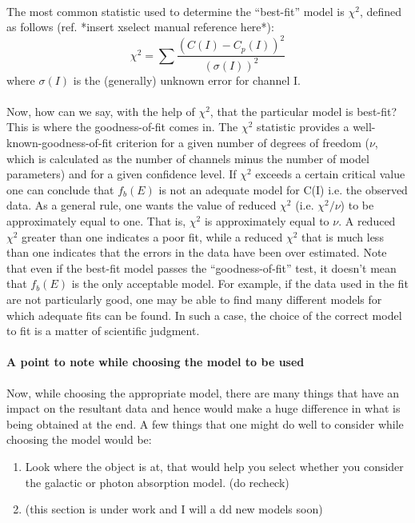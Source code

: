\documentclass[a4paper,twoside]{report}
\numberwithin{equation}{section}
\begin{document}
\paragraph{}
The most common statistic used to determine the “best-fit” model is $\chi^2$, defined as follows (ref. *insert xselect manual reference here*):
\begin{equation}
{\chi ^2} = \sum \frac{(C(I) - C_p (I))^2}{(\sigma (I))^2}
\end{equation}
where $\sigma (I)$ is the (generally) unknown error for channel I. 
\paragraph{}

Now, how can we say, with the help of $\chi ^2$, that the particular model is best-fit? This is where the goodness-of-fit comes in. The $\chi ^2$ statistic provides a well-known-goodness-of-fit criterion for a given number of degrees of freedom ($\nu$, which is calculated as the number of channels minus the number of model parameters) and for a given confidence level. If $\chi ^2$ exceeds a certain critical value one can conclude that $f_b (E)$ is not an adequate model for C(I) i.e. the observed data. As a general rule, one wants the value of reduced $\chi ^2$ (i.e. $\chi ^2 / \nu$) to be approximately equal to one. That is, $\chi ^2$ is approximately equal to $\nu$. A reduced $\chi ^2$ greater than one indicates a poor fit, while a reduced $\chi ^2$ that is much less than one indicates that the errors in the data have been over estimated. Note that even if the best-fit model passes the “goodness-of-fit” test, it doesn't mean that $f_b (E)$ is the only acceptable model. For example, if the data used in the fit are not particularly good, one may be able to find many different models for which adequate fits can be found. In such a case, the choice of the correct model to fit is a matter of scientific judgment.
\paragraph{A point to note while choosing the model to be used}
Now, while choosing the appropriate model, there are many things that have an impact on the resultant data and hence would make a huge difference in what is being obtained at the end. A few things that one might do well to consider while choosing the model would be:
\begin{enumerate}
\item Look where the object is at, that would help you select whether you consider the galactic or photon absorption model. (do recheck)
\item (this section is under work and I will a
dd new models soon) 
\end{enumerate}
\end{document}
